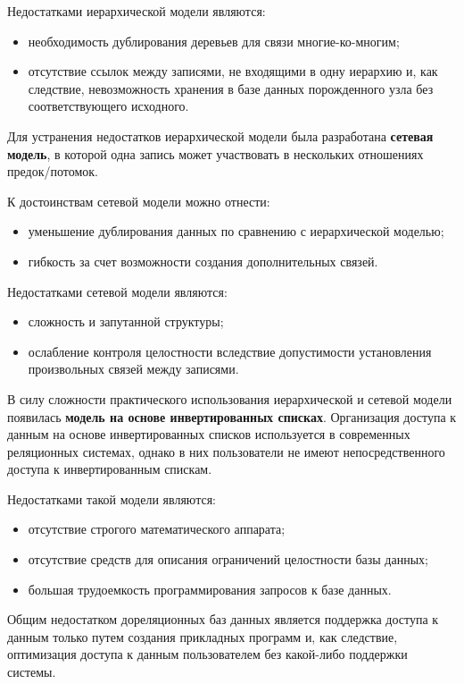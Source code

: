Недостатками иерархической модели являются:
\begin{itemize}
    \item необходимость дублирования деревьев для связи многие-ко-многим;
    \item отсутствие ссылок между записями, не входящими в одну иерархию и, как
        следствие, невозможность хранения в базе данных порожденного узла без
        соответствующего исходного.
\end{itemize}

Для устранения недостатков иерархической модели была разработана
\textbf{сетевая модель}, в которой одна запись может участвовать в нескольких
отношениях предок/потомок.

К достоинствам сетевой модели можно отнести:
\begin{itemize}
    \item уменьшение дублирования данных по сравнению с иерархической моделью;
    \item гибкость за счет возможности создания дополнительных связей.
\end{itemize}

Недостатками сетевой модели являются:
\begin{itemize}
    \item сложность и запутанной структуры;
    \item ослабление контроля целостности вследствие допустимости установления
        произвольных связей между записями.
\end{itemize}

В силу сложности практического использования иерархической и сетевой модели
появилась \textbf{модель на основе инвертированных списках}. Организация доступа
к данным на основе инвертированных списков используется в современных
реляционных системах, однако в них пользователи не имеют непосредственного
доступа к инвертированным спискам.

Недостатками такой модели являются:
\begin{itemize}
    \item отсутствие строгого математического аппарата;
    \item отсутствие средств для описания ограничений целостности базы данных;
    \item большая трудоемкость программирования запросов к базе данных.
\end{itemize}

Общим недостатком дореляционных баз данных является поддержка доступа к данным
только путем создания прикладных программ и, как следствие, оптимизация доступа
к данным пользователем без какой-либо поддержки системы.

